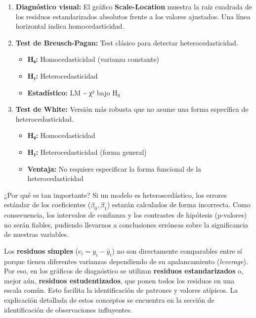 \documentclass[
  letterpaper,
  DIV=11,
  numbers=noendperiod]{scrreprt}
\providecommand{\tightlist}{%
  \setlength{\itemsep}{0pt}\setlength{\parskip}{0pt}}
\begin{document}
\begin{enumerate}
\def\labelenumi{\arabic{enumi}.}
\item
  \textbf{Diagnóstico visual:} El gráfico \textbf{Scale-Location}
  muestra la raíz cuadrada de los residuos estandarizados absolutos
  frente a los valores ajustados. Una línea horizontal indica
  homocedasticidad.
\item
  \textbf{Test de Breusch-Pagan:} Test clásico para detectar
  heterocedasticidad.

  \begin{itemize}
  \tightlist
  \item
    \textbf{H₀:} Homocedasticidad (varianza constante)
  \item
    \textbf{H₁:} Heterocedasticidad
  \item
    \textbf{Estadístico:} LM \textasciitilde{} χ² bajo H₀
  \end{itemize}
\item
  \textbf{Test de White:} Versión más robusta que no asume una forma
  específica de heterocedasticidad.

  \begin{itemize}
  \tightlist
  \item
    \textbf{H₀:} Homocedasticidad
  \item
    \textbf{H₁:} Heterocedasticidad (forma general)
  \item
    \textbf{Ventaja:} No requiere especificar la forma funcional de la
    heterocedasticidad
  \end{itemize}
\end{enumerate}

¿Por qué es tan importante? Si un modelo es heteroscedástico, los
errores estándar de los coeficientes (\(\beta_0, \beta_1\)) estarán
calculados de forma incorrecta. Como consecuencia, los intervalos de
confianza y los contrastes de hipótesis (p-valores) no serán fiables,
pudiendo llevarnos a conclusiones erróneas sobre la significancia de
nuestras variables.

\begin{tcolorbox}[enhanced jigsaw, breakable, toprule=.15mm, bottomtitle=1mm, coltitle=black, colbacktitle=quarto-callout-note-color!10!white, titlerule=0mm, opacitybacktitle=0.6, bottomrule=.15mm, toptitle=1mm, title=\textcolor{quarto-callout-note-color}{\faInfo}\hspace{0.5em}{Sobre los residuos estandarizados}, arc=.35mm, rightrule=.15mm, opacityback=0, colframe=quarto-callout-note-color-frame, leftrule=.75mm, left=2mm, colback=white]

Los \textbf{residuos simples} (\(e_i = y_i - \hat{y}_i\)) no son
directamente comparables entre sí porque tienen diferentes varianzas
dependiendo de su apalancamiento (\emph{leverage}). Por eso, en los
gráficos de diagnóstico se utilizan \textbf{residuos estandarizados} o,
mejor aún, \textbf{residuos estudentizados}, que ponen todos los
residuos en una escala común. Esto facilita la identificación de
patrones y valores atípicos. La explicación detallada de estos conceptos
se encuentra en la sección de identificación de observaciones
influyentes.

\end{tcolorbox}
\end{document}
